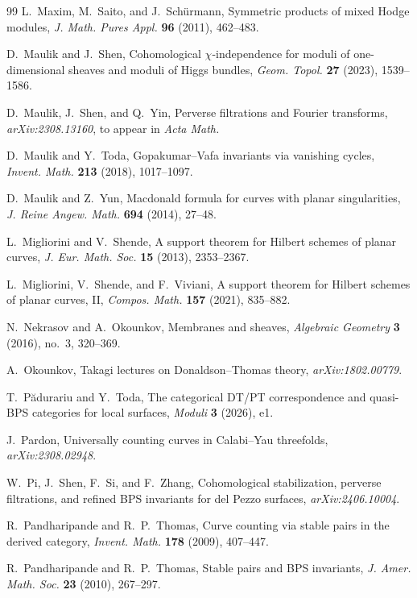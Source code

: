 \documentclass[11pt,reqno]{amsart}
\theoremstyle{definition}
\begin{document}
\begin{thebibliography}{99}
L.~Maxim, M.~Saito, and J.~Sch\"urmann,
Symmetric products of mixed Hodge modules,
\emph{J. Math. Pures Appl.} \textbf{96} (2011), 462--483.

D.~Maulik and J.~Shen,
Cohomological $\chi$-independence for moduli of one-dimensional sheaves
and moduli of Higgs bundles,
\emph{Geom. Topol.} \textbf{27} (2023), 1539--1586.

D.~Maulik, J.~Shen, and Q.~Yin,
Perverse filtrations and Fourier transforms,
\emph{arXiv:2308.13160}, to appear in \emph{Acta Math.}

D.~Maulik and Y.~Toda,
Gopakumar--Vafa invariants via vanishing cycles,
\emph{Invent. Math.} \textbf{213} (2018), 1017--1097.

D.~Maulik and Z.~Yun,
Macdonald formula for curves with planar singularities,
\emph{J. Reine Angew. Math.} \textbf{694} (2014), 27--48.

L.~Migliorini and V.~Shende,
A support theorem for Hilbert schemes of planar curves,
\emph{J. Eur. Math. Soc.} \textbf{15} (2013), 2353--2367.

L.~Migliorini, V.~Shende, and F.~Viviani,
A support theorem for Hilbert schemes of planar curves, II,
\emph{Compos. Math.} \textbf{157} (2021), 835--882.

N.~Nekrasov and A.~Okounkov,
Membranes and sheaves,
\emph{Algebraic Geometry} \textbf{3} (2016), no.~3, 320--369.

A.~Okounkov,
Takagi lectures on Donaldson--Thomas theory,
\emph{arXiv:1802.00779}.

T.~P\u{a}durariu and Y.~Toda,
The categorical DT/PT correspondence and quasi-BPS categories for local
surfaces,
\emph{Moduli} \textbf{3} (2026), e1.

J.~Pardon,
Universally counting curves in Calabi--Yau threefolds,
\emph{arXiv:2308.02948}.

W.~Pi, J.~Shen, F.~Si, and F.~Zhang,
Cohomological stabilization, perverse filtrations, and refined BPS
invariants for del Pezzo surfaces,
\emph{arXiv:2406.10004}.

R.~Pandharipande and R.~P.~Thomas,
Curve counting via stable pairs in the derived category,
\emph{Invent. Math.} \textbf{178} (2009), 407--447.

R.~Pandharipande and R.~P.~Thomas,
Stable pairs and BPS invariants,
\emph{J. Amer. Math. Soc.} \textbf{23} (2010), 267--297.


\end{thebibliography}
\end{document}
